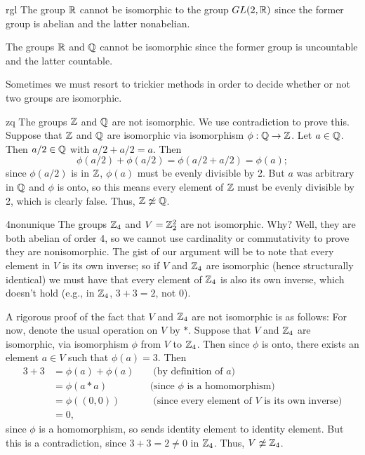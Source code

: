 \begin{example}{rgl} The group $\mathbb{R}$ cannot be isomorphic to the group $GL(2,\mathbb{R})$ since the former group is abelian and the latter nonabelian.\end{example}


\begin{example}{} The groups $\mathbb{R}$ and $\mathbb{Q}$ cannot be isomorphic since the former group is uncountable and the latter countable.\end{example}


Sometimes we must resort to trickier methods in order to decide whether or not two groups are isomorphic.


\begin{example}{zq} The groups $\mathbb{Z}$ and $\mathbb{Q}$ are not isomorphic.  We use contradiction to prove this. Suppose that $\mathbb{Z}$ and $\mathbb{Q}$ are isomorphic via isomorphism
$\phi :\mathbb{Q} \to \mathbb{Z}$.  Let $a\in \mathbb{Q}$.  Then $a/2 \in \mathbb{Q}$ with
$a/2 + a/2 =a$.  Then $$\phi(a/2)+\phi(a/2)=
\phi(a/2+a/2)=\phi(a);$$ since $\phi(a/2)$ is in $\mathbb{Z}$, $\phi(a)$
must be evenly divisible by 2. But $a$ was arbitrary in $\mathbb{Q}$ and
$\phi$ is onto, so this means every element of $\mathbb{Z}$ must be evenly
divisible by 2, which is clearly false. Thus, $\mathbb{Z}\not\simeq \mathbb{Q}$.
\end{example}


\begin{example}{4nonunique}
The groups $\mathbb{Z}_4$ and $V=\mathbb{Z}_2^2$ are not isomorphic.  Why?  Well, they are both abelian of order 4, so we cannot use cardinality or commutativity to prove they are nonisomorphic. The gist of our argument will be to note that every element in $V$ is its own inverse; so if $V$ and $\mathbb{Z}_4$ are isomorphic (hence structurally identical) we must have that every element of $\mathbb{Z}_4$ is also its own inverse, which doesn't hold (e.g., in $\mathbb{Z}_4$, $3+3=2$, not $0$).

    A rigorous proof of the fact that $V$ and $\mathbb{Z}_4$ are not isomorphic is as follows: For now, denote the usual operation on $V$ by $*$.  Suppose that $V$ and $\mathbb{Z}_4$ are isomorphic, via isomorphism $\phi$ from $V$ to $\mathbb{Z}_4$. Then since $\phi$ is onto, there exists an element $a\in V$ such that $\phi(a)=3$.  Then
    \begin{align*}
    3+3&=\phi(a)+\phi(a)&&\text{ (by definition of $a$)}\\
    &=\phi(a*a) &&\text{(since $\phi$ is a homomorphism)}\\
    &=\phi((0,0)) &&\text{ (since every element of $V$ is its own inverse)}\\
    &=0, &&
    \end{align*}
   since $\phi$ is a homomorphism, so sends identity element to identity element. But this is a contradiction, since $3+3=2\neq 0$ in $\mathbb{Z}_4$.  Thus, $V\not\simeq \mathbb{Z}_4$.
\end{example}


